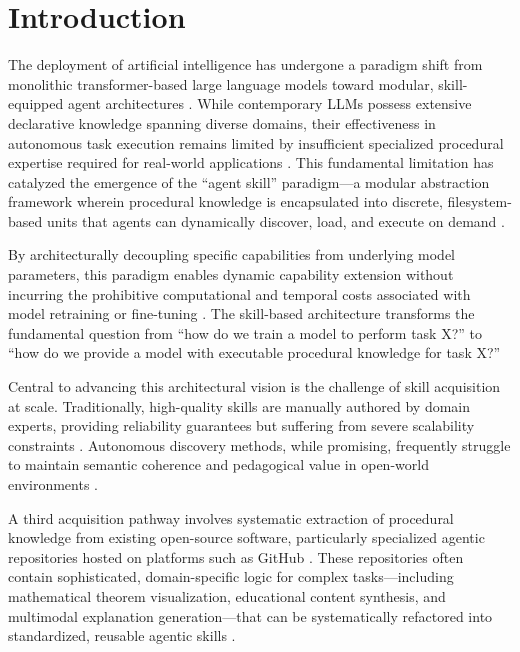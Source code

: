 \documentclass[11pt,a4paper]{article}
\begin{document}
\section{Introduction}

The deployment of artificial intelligence has undergone a paradigm shift from monolithic transformer-based large language models toward modular, skill-equipped agent architectures \cite{alphaxiv2024skills, arxiv2024skillframework}. While contemporary LLMs possess extensive declarative knowledge spanning diverse domains, their effectiveness in autonomous task execution remains limited by insufficient specialized procedural expertise required for real-world applications \cite{arxiv2024skillframework, researchgate2024agentskills}. This fundamental limitation has catalyzed the emergence of the ``agent skill'' paradigm---a modular abstraction framework wherein procedural knowledge is encapsulated into discrete, filesystem-based units that agents can dynamically discover, load, and execute on demand \cite{alphaxiv2024skills, arxiv2024skillframework}.

By architecturally decoupling specific capabilities from underlying model parameters, this paradigm enables dynamic capability extension without incurring the prohibitive computational and temporal costs associated with model retraining or fine-tuning \cite{arxiv2024skillframework, researchgate2024agentskills}. The skill-based architecture transforms the fundamental question from ``how do we train a model to perform task X?'' to ``how do we provide a model with executable procedural knowledge for task X?''

Central to advancing this architectural vision is the challenge of skill acquisition at scale. Traditionally, high-quality skills are manually authored by domain experts, providing reliability guarantees but suffering from severe scalability constraints \cite{alphaxiv2024skills, arxiv2024skillframework}. Autonomous discovery methods, while promising, frequently struggle to maintain semantic coherence and pedagogical value in open-world environments \cite{alphaxiv2024skills, iccv2025openworldskill}. 

A third acquisition pathway involves systematic extraction of procedural knowledge from existing open-source software, particularly specialized agentic repositories hosted on platforms such as GitHub \cite{alphaxiv2024skills, github2024repo2ai}. These repositories often contain sophisticated, domain-specific logic for complex tasks---including mathematical theorem visualization, educational content synthesis, and multimodal explanation generation---that can be systematically refactored into standardized, reusable agentic skills \cite{teaproject2024, arxiv2024tea, github2024code2video}.
\end{document}

